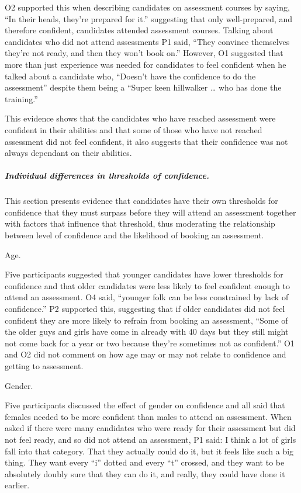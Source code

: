 \documentclass[a4paper,]{book}
\let\oldsubparagraph\subparagraph
\renewcommand{\subparagraph}[1]{\oldsubparagraph{#1}\mbox{}}
\begin{document}
O2 supported this when describing candidates on assessment courses by saying, ``In their heads, they're prepared for it.'' suggesting that only well-prepared, and therefore confident, candidates attended assessment courses. Talking about candidates who did not attend assessments P1 said, ``They convince themselves they're not ready, and then they won't book on.'' However, O1 suggested that more than just experience was needed for candidates to feel confident when he talked about a candidate who, ``Doesn't have the confidence to do the assessment'' despite them being a ``Super keen hillwalker \ldots{} who has done the training.''

This evidence shows that the candidates who have reached assessment were confident in their abilities and that some of those who have not reached assessment did not feel confident, it also suggests that their confidence was not always dependant on their abilities.

\hypertarget{individual-differences-in-thresholds-of-confidence.}{%
\subparagraph{Individual differences in thresholds of confidence.}\label{individual-differences-in-thresholds-of-confidence.}}

This section presents evidence that candidates have their own thresholds for confidence that they must surpass before they will attend an assessment together with factors that influence that threshold, thus moderating the relationship between level of confidence and the likelihood of booking an assessment.

Age.

Five participants suggested that younger candidates have lower thresholds for confidence and that older candidates were less likely to feel confident enough to attend an assessment. O4 said, ``younger folk can be less constrained by lack of confidence.'' P2 supported this, suggesting that if older candidates did not feel confident they are more likely to refrain from booking an assessment, ``Some of the older guys and girls have come in already with 40 days but they still might not come back for a year or two because they're sometimes not as confident.'' O1 and O2 did not comment on how age may or may not relate to confidence and getting to assessment.

Gender.

Five participants discussed the effect of gender on confidence and all said that females needed to be more confident than males to attend an assessment. When asked if there were many candidates who were ready for their assessment but did not feel ready, and so did not attend an assessment, P1 said:
I think a lot of girls fall into that category. That they actually could do it, but it feels like such a big thing. They want every ``i'' dotted and every ``t'' crossed, and they want to be absolutely doubly sure that they can do it, and really, they could have done it earlier.
\end{document}
